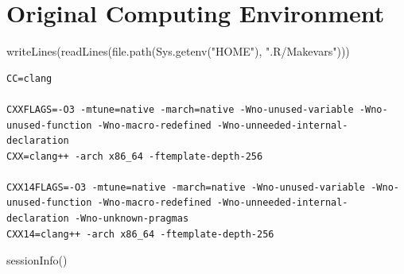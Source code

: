 \documentclass[
  letterpaper,
  DIV=11,
  numbers=noendperiod]{scrartcl}
\newenvironment{Shaded}{\begin{snugshade}}{\end{snugshade}}
\newcommand{\FunctionTok}[1]{\textcolor[rgb]{0.28,0.35,0.67}{#1}}
\newcommand{\NormalTok}[1]{\textcolor[rgb]{0.00,0.23,0.31}{#1}}
\newcommand{\StringTok}[1]{\textcolor[rgb]{0.13,0.47,0.30}{#1}}
\begin{document}
\hypertarget{original-computing-environment}{%
\section*{Original Computing
Environment}\label{original-computing-environment}}

\begin{Shaded}
\begin{Highlighting}[]
\FunctionTok{writeLines}\NormalTok{(}\FunctionTok{readLines}\NormalTok{(}\FunctionTok{file.path}\NormalTok{(}\FunctionTok{Sys.getenv}\NormalTok{(}\StringTok{"HOME"}\NormalTok{), }\StringTok{".R/Makevars"}\NormalTok{)))}
\end{Highlighting}
\end{Shaded}

\begin{verbatim}
CC=clang

CXXFLAGS=-O3 -mtune=native -march=native -Wno-unused-variable -Wno-unused-function -Wno-macro-redefined -Wno-unneeded-internal-declaration
CXX=clang++ -arch x86_64 -ftemplate-depth-256

CXX14FLAGS=-O3 -mtune=native -march=native -Wno-unused-variable -Wno-unused-function -Wno-macro-redefined -Wno-unneeded-internal-declaration -Wno-unknown-pragmas
CXX14=clang++ -arch x86_64 -ftemplate-depth-256
\end{verbatim}

\begin{Shaded}
\begin{Highlighting}[]
\FunctionTok{sessionInfo}\NormalTok{()}
\end{Highlighting}
\end{Shaded}
\end{document}
